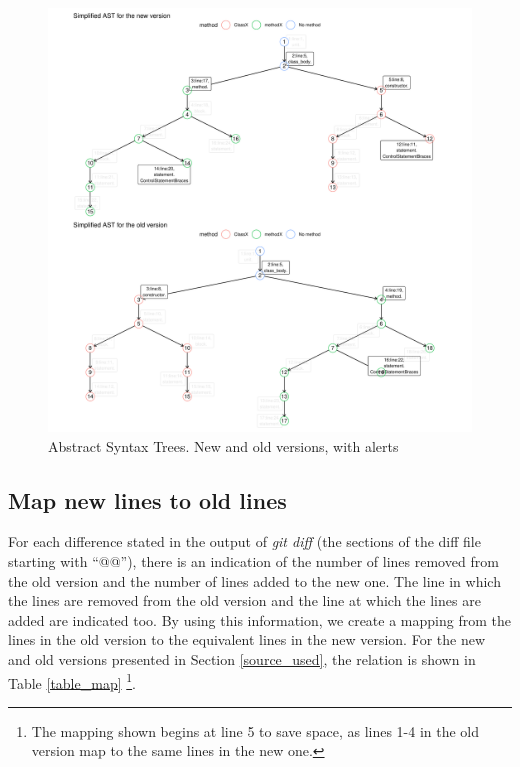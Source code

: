 \documentclass[
]{article}
\begin{document}
\begin{figure}[H]
\includegraphics[width=1\linewidth]{report_files/figure-latex/unnamed-chunk-5-1} \caption{Abstract Syntax Trees. New and old versions, with alerts \label{AST_compare_id_alerts}}\label{fig:unnamed-chunk-5}
\end{figure}

\normalsize

\subsection{Map new lines to old lines}\label{map}

For each difference stated in the output of \textit{git diff} (the
sections of the diff file starting with ``@@''), there is an indication
of the number of lines removed from the old version and the number of
lines added to the new one. The line in which the lines are removed from
the old version and the line at which the lines are added are indicated
too. By using this information, we create a mapping from the lines in the
old version to the equivalent lines in the new version. For the new and
old versions presented in Section \ref{source_used}, the relation is
shown in Table \ref{table_map}
\footnote{The mapping shown begins at line 5 to save space, as lines 1-4 in the old version map to the same lines in the new one.}.
\end{document}
